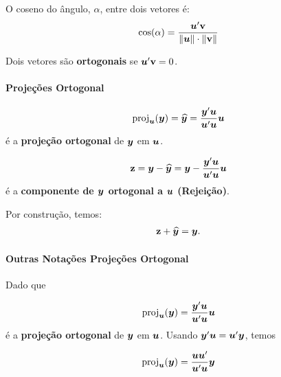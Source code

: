 \documentclass[11pt, oneside, a4paper, article]{article}
\numberwithin{equation}{section}
\begin{document}
\begin{description}
O coseno do ângulo, $\alpha$, entre dois vetores é:
\begin{align*}
	\cos(\alpha) = \frac{\boldsymbol{u}'\mathbf{v}}{\|\boldsymbol{u} \|\cdot\|\mathbf{v} \|}
\end{align*}

Dois vetores são \textbf{ortogonais} se $\boldsymbol{u}'\mathbf{v} = 0$.

\paragraph{Projeções Ortogonal}

\vspace{-1 em}
\begin{align*}
\text{proj}_{\boldsymbol{u}}(\boldsymbol{y}) =
\widehat{\boldsymbol{y}} =
\frac{\boldsymbol{y}' \boldsymbol{u}}{\boldsymbol{u}'\boldsymbol{u}} \boldsymbol{u}
\end{align*}
é a \textbf{projeção ortogonal} de $\boldsymbol{y}$ em $\boldsymbol{u}$.

\vspace{-1 em}
\begin{align*}
\mathbf{z} = \boldsymbol{y} - \widehat{\boldsymbol{y}} = \boldsymbol{y} - \frac{\boldsymbol{y}' \boldsymbol{u}}{\boldsymbol{u}'\boldsymbol{u}} \boldsymbol{u}
\end{align*}
é a \textbf{componente de $\boldsymbol{y}$ ortogonal a $\boldsymbol{u}$} \textbf{(Rejeição)}.

Por construção, temos:
\vspace{-1 em}
\begin{align*}
\mathbf{z} + \widehat{\boldsymbol{y}} = \boldsymbol{y}.
\end{align*}


\paragraph{Outras Notações Projeções Ortogonal}
Dado que

\vspace{-1 em}
\begin{align*}
\text{proj}_{\boldsymbol{u}}(\boldsymbol{y}) =
\frac{\boldsymbol{y}' \boldsymbol{u}}{\boldsymbol{u}'\boldsymbol{u}} \boldsymbol{u}
\end{align*}
é a \textbf{projeção ortogonal} de $\boldsymbol{y}$ em $\boldsymbol{u}$.
Usando $\boldsymbol{y}'\boldsymbol{u} = \boldsymbol{u}'\boldsymbol{y}$, temos

\vspace{-1 em}
\begin{align*}
\text{proj}_{\boldsymbol{u}}(\boldsymbol{y}) =
\frac{\boldsymbol{u} \boldsymbol{u}'}{\boldsymbol{u}'\boldsymbol{u}} \boldsymbol{y}
\end{align*}


\end{description}
\end{document}
